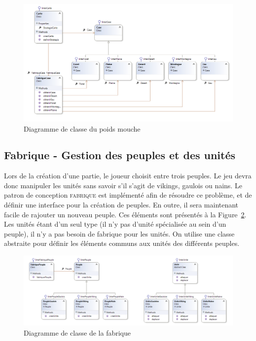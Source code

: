 \documentclass[a4paper]{article}%
\begin{document}
\begin{figure}[H]
    \centering
    \includegraphics[width=\textwidth]{./images/classe/poidsmouche.png}
		\caption{Diagramme de classe du poids mouche}
		\label{fig:class_poidsmouche}
\end{figure}

\subsection{Fabrique - Gestion des peuples et des unités}

Lors de la création d'une partie, le joueur choisit entre trois peuples. Le jeu devra donc manipuler les unités sans savoir s'il s'agit de vikings, gaulois ou nains. Le patron de conception \textsc{fabrique} est implémenté afin de résoudre ce problème, et de définir une interface pour la création de peuples. En outre, il sera maintenant facile de rajouter un nouveau peuple. Ces éléments sont présentés à la Figure~\ref{fig:class_fabrique}.
Les unités étant d'un seul type (il n'y pas d'unité spécialisée au sein d'un peuple), il n'y a pas besoin de fabrique pour les unités. On utilise une classe abstraite pour définir les éléments communs aux unités des différents peuples. 

\begin{figure}[H]
    \centering
    \includegraphics[width=\textwidth]{./images/classe/fabrique.png}
		\caption{Diagramme de classe de la fabrique}
		\label{fig:class_fabrique}
\end{figure}
\end{document}
